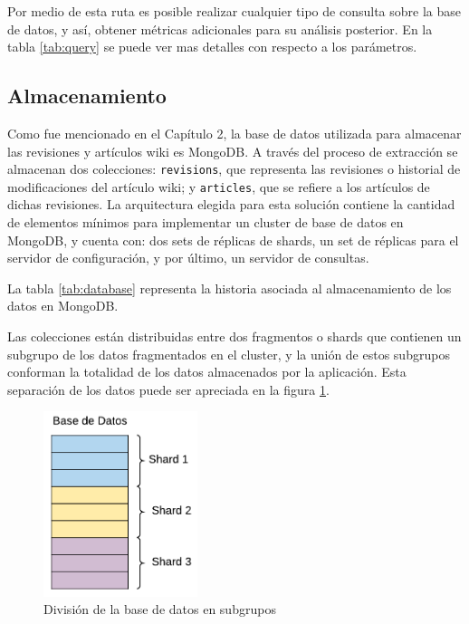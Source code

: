 Por medio de esta ruta es posible realizar cualquier tipo de consulta sobre la base de datos, y así, obtener métricas
adicionales para su análisis posterior. En la tabla \ref{tab:query} se puede ver mas detalles con respecto a los parámetros.






\subsection{Almacenamiento}

Como fue mencionado en el Capítulo 2, la base de datos utilizada para almacenar las revisiones y artículos wiki es MongoDB.
A través del proceso de extracción se almacenan dos colecciones:
\texttt{revisions}, que representa las revisiones o historial de modificaciones del artículo wiki;
y \texttt{articles}, que se refiere a los artículos de dichas revisiones.
La arquitectura elegida para esta solución contiene la cantidad de elementos mínimos para implementar un cluster de base de datos en MongoDB, y cuenta con: dos sets de réplicas de shards, un set de réplicas para el servidor de configuración, y por último, un servidor de consultas.

La tabla \ref{tab:database} representa la historia asociada al almacenamiento de los datos en MongoDB.



Las colecciones están distribuidas entre dos fragmentos o shards que contienen un subgrupo de los datos fragmentados en el cluster, y la unión de estos subgrupos conforman la totalidad de los datos almacenados por la aplicación.
Esta separación de los datos puede ser apreciada en la figura \ref{fig:sharded_database}.

\begin{figure}[H]
	\centering
		\includegraphics[width=0.4\textwidth]{figures/sharded_database}
	\caption{División de la base de datos en subgrupos}
	\label{fig:sharded_database}
\end{figure}

